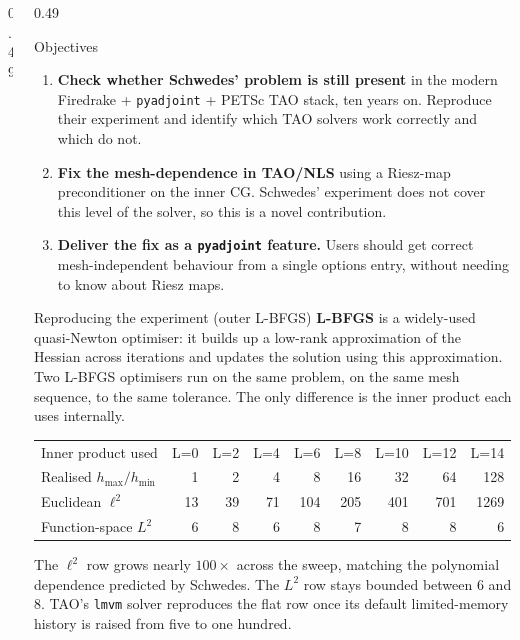\documentclass[final]{beamer}
\begin{document}
\begin{frame}[t]
\begin{columns}[t,totalwidth=\dimexpr\paperwidth-3cm\relax]
\begin{column}{0.49\dimexpr\paperwidth-3cm\relax}
\end{column}

\begin{column}{0.49\dimexpr\paperwidth-3cm\relax}

\begin{block}{Objectives}
\begin{enumerate}
\item \textbf{Check whether Schwedes' problem is still present} in the modern Firedrake + \texttt{pyadjoint} + PETSc TAO stack, ten years on. Reproduce their experiment and identify which TAO solvers work correctly and which do not.
\item \textbf{Fix the mesh-dependence in TAO/NLS} using a Riesz-map preconditioner on the inner CG. Schwedes' experiment does not cover this level of the solver, so this is a novel contribution.
\item \textbf{Deliver the fix as a \texttt{pyadjoint} feature.} Users should get correct mesh-independent behaviour from a single options entry, without needing to know about Riesz maps.
\end{enumerate}
\end{block}

\begin{block}{Reproducing the experiment (outer L-BFGS)}
\textbf{L-BFGS} is a widely-used quasi-Newton optimiser: it builds up a low-rank approximation of the Hessian across iterations and updates the solution using this approximation. Two L-BFGS optimisers run on the same problem, on the same mesh sequence, to the same tolerance. The only difference is the inner product each uses internally.

\vspace{0.3em}
\centering\small
\begin{tabular}{lrrrrrrrr}
\toprule
Inner product used & L=0 & L=2 & L=4 & L=6 & L=8 & L=10 & L=12 & L=14 \\
Realised $h_{\max}/h_{\min}$          & 1 & 2 & 4 & 8 & 16 & 32 & 64 & 128 \\
\midrule
Euclidean $\ell^{2}$                  & 13 & 39 & 71 & 104 & 205 & 401 & 701 & 1269 \\
Function-space $L^{2}$                & 6 & 8 & 6 & 8 & 7 & 8 & 8 & 6 \\
\bottomrule
\end{tabular}

\vspace{0.4em}
\raggedright
The $\ell^{2}$ row grows nearly $100\times$ across the sweep, matching the polynomial dependence predicted by Schwedes. The $L^{2}$ row stays bounded between 6 and 8. TAO's \texttt{lmvm} solver reproduces the flat row once its default limited-memory history is raised from five to one hundred.
\end{block}


\end{column}
\end{columns}
\end{frame}
\end{document}

